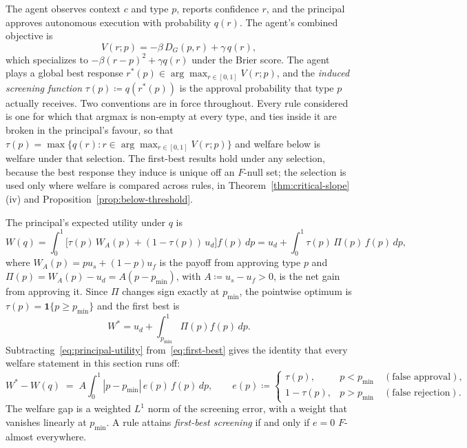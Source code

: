 \documentclass[acmsmall,nonacm,screen]{acmart}
\theoremstyle{acmplain}%
\theoremstyle{acmdefinition}%
\numberwithin{equation}{section}
\begin{document}
The agent observes context $c$ and type $p$, reports confidence $r$, and the principal approves autonomous execution with probability $q(r)$. The agent's combined objective is
\begin{equation}\label{eq:behavioral-objective}
V(r;p) = -\beta\, D_G(p,r) + \gamma\, q(r),
\end{equation}
which specializes to $-\beta(r-p)^2 + \gamma q(r)$ under the Brier score. The agent plays a global best response $r^*(p) \in \arg\max_{r \in [0,1]} V(r;p)$, and the \emph{induced screening function} $\tau(p) \coloneqq q(r^*(p))$ is the approval probability that type $p$ actually receives. Two conventions are in force throughout. Every rule considered is one for which that argmax is non-empty at every type, and ties inside it are broken in the principal's favour, so that $\tau(p) = \max\{q(r) : r \in \arg\max_{r \in [0,1]} V(r;p)\}$ and welfare below is welfare under that selection. The first-best results hold under any selection, because the best response they induce is unique off an $F$-null set; the selection is used only where welfare is compared across rules, in Theorem~\ref{thm:critical-slope}(iv) and Proposition~\ref{prop:below-threshold}.

The principal's expected utility under $q$ is
\begin{equation}\label{eq:principal-utility}
W(q) = \int_0^1 \bigl[\tau(p)\, W_A(p) + (1-\tau(p))\, u_d\bigr] f(p)\, dp = u_d + \int_0^1 \tau(p)\, \Pi(p)\, f(p)\, dp,
\end{equation}
where $W_A(p) = p u_s + (1-p) u_f$ is the payoff from approving type $p$ and $\Pi(p) = W_A(p) - u_d = A(p - p_{\min})$, with $A \coloneqq u_s - u_f > 0$, is the net gain from approving it. Since $\Pi$ changes sign exactly at $p_{\min}$, the pointwise optimum is $\tau(p) = \mathbf 1\{p \ge p_{\min}\}$ and the first best is
\begin{equation}\label{eq:first-best}
W^* = u_d + \int_{p_{\min}}^1 \Pi(p) f(p)\, dp .
\end{equation}
Subtracting~\eqref{eq:principal-utility} from~\eqref{eq:first-best} gives the identity that every welfare statement in this section runs off:
\begin{equation}\label{eq:welfare-gap-identity}
W^* - W(q) \;=\; A\int_0^1 |p - p_{\min}|\, e(p)\, f(p)\, dp, \qquad e(p) \coloneqq \begin{cases} \tau(p), & p < p_{\min} \quad (\text{false approval}),\\ 1 - \tau(p), & p > p_{\min} \quad (\text{false rejection}).\end{cases}
\end{equation}
The welfare gap is a weighted $L^1$ norm of the screening error, with a weight that vanishes linearly at $p_{\min}$. A rule attains \emph{first-best screening} if and only if $e = 0$ $F$-almost everywhere.
\end{document}
